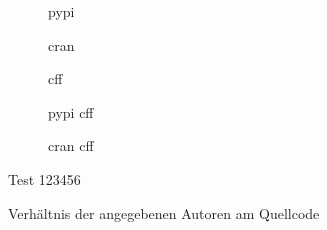 \begin{figure}
    \begin{subfigure}{.5\textwidth}
        \centering
        
        \caption{\gls{pypi}}
        \label{fig:common_authors_2_pypi}
    \end{subfigure}%
    \begin{subfigure}{.5\textwidth}
        \centering
        
        \caption{\gls{cran}}
        \label{fig:common_authors_2_cran}
    \end{subfigure}
    \begin{subfigure}{.5\textwidth}
        \centering
        
        \caption{\gls{cff}}
        \label{fig:common_authors_2_cff}
    \end{subfigure}%
    \begin{subfigure}{.5\textwidth}
        \centering
        
        \caption{\gls{pypi} \gls{cff}}
        \label{fig:common_authors_2_pypi_cff}
    \end{subfigure}
    \centering
    \begin{subfigure}{.5\textwidth}
        \centering
        
        \caption{\gls{cran} \gls{cff}}
        \label{fig:common_authors_2_cran_cff}
    \end{subfigure}
    \caption{Verhältnis der angegebenen Autoren am Quellcode}
    \small
    Test 123456
\end{figure}

